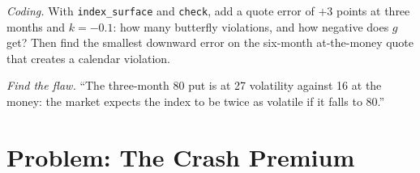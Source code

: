 \begin{exercise}[$\star\star\star$]\label{exo:dv:implied-volatility-and-its-surface:7}
\emph{Coding.} With \texttt{index\_surface} and \texttt{check}, add a quote error of $+3$
points at three months and $k=-0.1$: how many butterfly violations, and how negative does
$g$ get? Then find the smallest downward error on the six-month at-the-money quote that
creates a calendar violation.
\end{exercise}

\begin{exercise}[$\star\star\star$]\label{exo:dv:implied-volatility-and-its-surface:8}
\emph{Find the flaw.} ``The three-month 80 put is at 27 volatility against 16 at the money:
the market expects the index to be twice as volatile if it falls to 80.''
\end{exercise}

\section{Problem: The Crash Premium}

